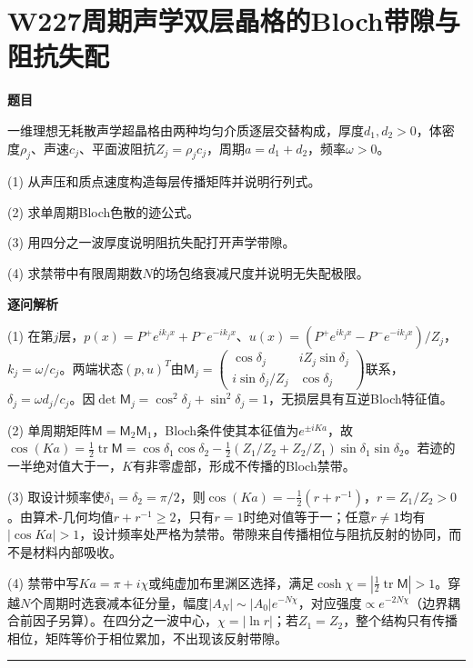 \documentclass[UTF8,a4paper,11pt,oneside,openany]{ctexbook}
\begin{document}
\section*{W227\quad 周期声学双层晶格的Bloch带隙与阻抗失配}
\textbf{题目}\par
一维理想无耗散声学超晶格由两种均匀介质逐层交替构成，厚度$d_1,d_2>0$，体密度$\rho_j$、声速$c_j$、平面波阻抗$Z_j=\rho_jc_j$，周期$a=d_1+d_2$，频率$\omega>0$。
\par\smallskip\noindent (1) 从声压和质点速度构造每层传播矩阵并说明行列式。
\par\smallskip\noindent (2) 求单周期Bloch色散的迹公式。
\par\smallskip\noindent (3) 用四分之一波厚度说明阻抗失配打开声学带隙。
\par\smallskip\noindent (4) 求禁带中有限周期数$N$的场包络衰减尺度并说明无失配极限。
\par\medskip\textbf{逐问解析}\par
\par\smallskip\noindent (1) 在第$j$层，$p(x)=P^+e^{ik_jx}+P^-e^{-ik_jx}$、$u(x)=(P^+e^{ik_jx}-P^-e^{-ik_jx})/Z_j$，$k_j=\omega/c_j$。两端状态$(p,u)^T$由$\mathsf M_j=\begin{pmatrix}\cos\delta_j&iZ_j\sin\delta_j\\i\sin\delta_j/Z_j&\cos\delta_j\end{pmatrix}$联系，$\delta_j=\omega d_j/c_j$。因$\det\mathsf M_j=\cos^2\delta_j+\sin^2\delta_j=1$，无损层具有互逆Bloch特征值。
\par\smallskip\noindent (2) 单周期矩阵$\mathsf M=\mathsf M_2\mathsf M_1$，Bloch条件使其本征值为$e^{\pm iKa}$，故$\cos(Ka)=\tfrac12\operatorname{tr}\mathsf M=\cos\delta_1\cos\delta_2-\tfrac12(Z_1/Z_2+Z_2/Z_1)\sin\delta_1\sin\delta_2$。若迹的一半绝对值大于一，$K$有非零虚部，形成不传播的Bloch禁带。
\par\smallskip\noindent (3) 取设计频率使$\delta_1=\delta_2=\pi/2$，则$\cos(Ka)=-\tfrac12(r+r^{-1})$，$r=Z_1/Z_2>0$。由算术-几何均值$r+r^{-1}\ge2$，只有$r=1$时绝对值等于一；任意$r\ne1$均有$|\cos Ka|>1$，设计频率处严格为禁带。带隙来自传播相位与阻抗反射的协同，而不是材料内部吸收。
\par\smallskip\noindent (4) 禁带中写$Ka=\pi+i\chi$或纯虚加布里渊区选择，满足$\cosh\chi=|\tfrac12\operatorname{tr}\mathsf M|>1$。穿越$N$个周期时选衰减本征分量，幅度$|A_N|\sim |A_0|e^{-N\chi}$，对应强度$\propto e^{-2N\chi}$（边界耦合前因子另算）。在四分之一波中心，$\chi=|\ln r|$；若$Z_1=Z_2$，整个结构只有传播相位，矩阵等价于相位累加，不出现该反射带隙。
\par\medskip\hrule\medskip
\end{document}
